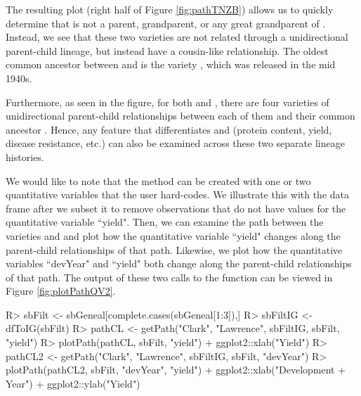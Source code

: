 \documentclass[article,shortnames]{jss}
\begin{document}
The resulting plot (right half of Figure \ref{fig:pathTNZB}) allows us to quickly determine that  is not a parent, grandparent, or any great grandparent of . Instead, we see that these two varieties are not related through a unidirectional parent-child lineage, but instead have a cousin-like relationship. The oldest common ancestor between  and  is the variety , which was released in the mid 1940s.

Furthermore, as seen in the figure, for both  and , there are four varieties of unidirectional parent-child relationships between each of them and their common ancestor . Hence, any feature that differentiates  and  (protein content, yield, disease resistance, etc.) can also be examined across these two separate lineage histories.

We would like to note that the  method can be created with one or two quantitative variables that the user hard-codes. We illustrate this with the  data frame after we subset it to remove observations that do not have values for the quantitative variable ``yield". Then, we can examine the path between the varieties  and  and plot how the quantitative variable ``yield" changes along the parent-child relationships of that path. Likewise, we plot how the quantitative variables ``devYear" and ``yield" both change along the parent-child relationships of that path. The output of these two calls to the  function can be viewed in Figure \ref{fig:plotPathQV2}.

\begin{Code}
R> sbFilt <- sbGeneal[complete.cases(sbGeneal[1:3]),]
R> sbFiltIG <- dfToIG(sbFilt)
R> pathCL <- getPath("Clark", "Lawrence", sbFiltIG, sbFilt, "yield")
R> plotPath(pathCL, sbFilt, "yield") + ggplot2::xlab("Yield")
R> pathCL2 <- getPath("Clark", "Lawrence", sbFiltIG, sbFilt, "devYear")
R> plotPath(pathCL2, sbFilt, "devYear", "yield") + ggplot2::xlab("Development
+    Year") + ggplot2::ylab("Yield")
\end{Code}
\end{document}
